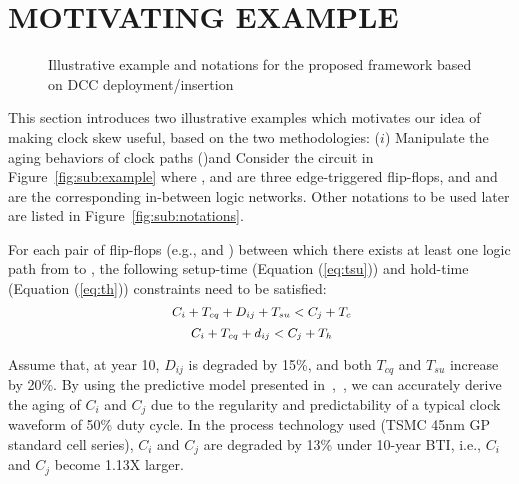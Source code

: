 \section{MOTIVATING EXAMPLE}
\label{sec:motivate}
\begin{figure*}[!ht]
    \centering
    \hspace{1.6cm}
    \caption{Illustrative example and notations for the proposed framework based on DCC deployment/insertion}
    \label{fig:en}
\end{figure*}


This section introduces two illustrative examples which motivates our idea of making clock skew useful, based on the two methodologies: ($i$) Manipulate the aging behaviors of clock paths ()and  Consider the circuit in Figure~\ref{fig:sub:example} where ,  and  are three edge-triggered flip-flops, and  and  are the corresponding in-between logic networks. Other notations to be used later are listed in Figure~\ref{fig:sub:notations}.

For each pair of flip-flops (e.g.,  and ) between which there exists at least one logic path from  to , the following setup-time (Equation (\ref{eq:tsu})) and hold-time (Equation (\ref{eq:th})) constraints need to be satisfied:
\begin{equation}
	\mbox{\fontsize{9}{9.6} $C_i+T_{cq}+D_{ij}+T_{su}<C_j+T_c$}
	\label{eq:tsu}
\end{equation}
\begin{equation}
	\mbox{\fontsize{9}{9.6} $C_i+T_{cq}+d_{ij}<C_j+T_h$}
	\label{eq:th}
\end{equation}

Assume that, at year 10, $D_{ij}$ is degraded by 15\%, and both $T_{cq}$ and $T_{su}$ increase by 20\%. By using the predictive model presented in~\cite{wang2010impact},~\cite{wang2007efficient}, we can accurately derive the aging of $C_i$ and $C_j$ due to the regularity and predictability of a typical clock waveform of 50\% duty cycle. In the process technology used (TSMC 45nm GP standard cell series), $C_i$ and $C_j$ are degraded by 13\% under 10-year BTI, i.e., $C_i$ and $C_j$ become 1.13X larger.

